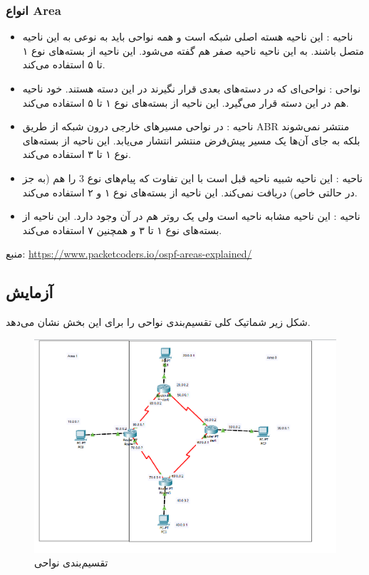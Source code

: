 \documentclass[12pt]{article}
\begin{document}
\subsubsection{انواع Area}
\begin{itemize}
	\item ناحیه : این ناحیه هسته اصلی شبکه  است و همه نواحی باید به نوعی به این ناحیه متصل باشند. به این ناحیه ناحیه صفر هم گفته می‌شود. این ناحیه از بسته‌های نوع ۱ تا ۵ استفاده می‌کند.
	
	\item نواحی :
	نواحی‌ای که در دسته‌های بعدی قرار نگیرند در این دسته هستند. خود ناحیه  هم در این دسته قرار می‌گیرد. این ناحیه از بسته‌های نوع ۱ تا ۵ استفاده می‌کند.
	
	\item ناحیه :
	در نواحی  مسیر‌های خارجی درون شبکه از طریق ABR منتشر نمی‌شوند بلکه به جای آن‌ها یک مسیر پیش‌فرض منتشر انتشار می‌یابد. این ناحیه از بسته‌های نوع ۱ تا ۳ استفاده می‌کند.
	
	\item ناحیه :
	این ناحیه شبیه ناحیه قبل است با این تفاوت که پیام‌های نوع 3 را هم (به جز در حالتی خاص) دریافت نمی‌کند. این ناحیه از بسته‌های نوع ۱ و ۲ استفاده می‌کند.
	
	\item ناحیه :
	این ناحیه مشابه ناحیه  است ولی یک روتر  هم در آن وجود دارد. این ناحیه از بسته‌های نوع ۱ تا ۳ و همچنین ۷ استفاده می‌کند.
\end{itemize}


منبع: \url{https://www.packetcoders.io/ospf-areas-explained/}
\subsection{آزمایش}

شکل زیر شماتیک کلی تقسیم‌بندی نواحی را برای این بخش نشان می‌دهد.

\begin{figure}[H]
	\centering
	\includegraphics[scale=0.4]{images/ospf/topo.png}
	\caption{تقسیم‌بندی نواحی } 
	\label{ospftopo}
\end{figure}
\end{document}
